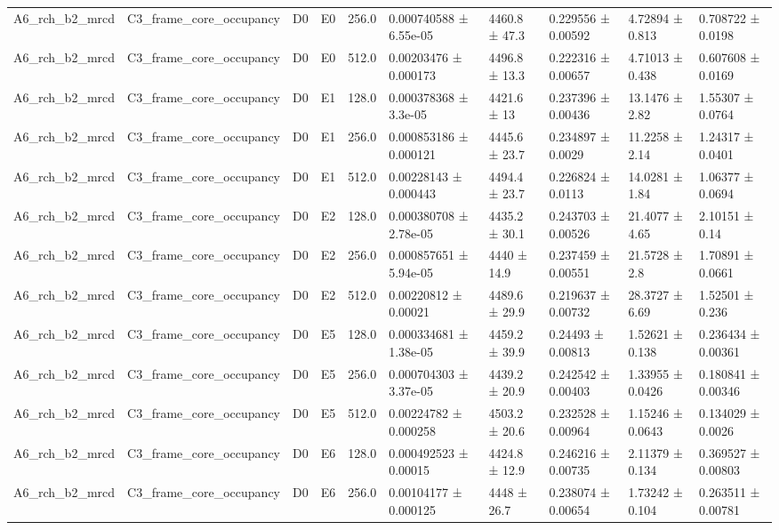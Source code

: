 \begin{table}
\begin{tabular}{llllllllll}
A6\_rch\_b2\_mrcd & C3\_frame\_core\_occupancy & D0 & E0 & 256.0 & 0.000740588 ± 6.55e-05 & 4460.8 ± 47.3 & 0.229556 ± 0.00592 & 4.72894 ± 0.813 & 0.708722 ± 0.0198 \\
A6\_rch\_b2\_mrcd & C3\_frame\_core\_occupancy & D0 & E0 & 512.0 & 0.00203476 ± 0.000173 & 4496.8 ± 13.3 & 0.222316 ± 0.00657 & 4.71013 ± 0.438 & 0.607608 ± 0.0169 \\
A6\_rch\_b2\_mrcd & C3\_frame\_core\_occupancy & D0 & E1 & 128.0 & 0.000378368 ± 3.3e-05 & 4421.6 ± 13 & 0.237396 ± 0.00436 & 13.1476 ± 2.82 & 1.55307 ± 0.0764 \\
A6\_rch\_b2\_mrcd & C3\_frame\_core\_occupancy & D0 & E1 & 256.0 & 0.000853186 ± 0.000121 & 4445.6 ± 23.7 & 0.234897 ± 0.0029 & 11.2258 ± 2.14 & 1.24317 ± 0.0401 \\
A6\_rch\_b2\_mrcd & C3\_frame\_core\_occupancy & D0 & E1 & 512.0 & 0.00228143 ± 0.000443 & 4494.4 ± 23.7 & 0.226824 ± 0.0113 & 14.0281 ± 1.84 & 1.06377 ± 0.0694 \\
A6\_rch\_b2\_mrcd & C3\_frame\_core\_occupancy & D0 & E2 & 128.0 & 0.000380708 ± 2.78e-05 & 4435.2 ± 30.1 & 0.243703 ± 0.00526 & 21.4077 ± 4.65 & 2.10151 ± 0.14 \\
A6\_rch\_b2\_mrcd & C3\_frame\_core\_occupancy & D0 & E2 & 256.0 & 0.000857651 ± 5.94e-05 & 4440 ± 14.9 & 0.237459 ± 0.00551 & 21.5728 ± 2.8 & 1.70891 ± 0.0661 \\
A6\_rch\_b2\_mrcd & C3\_frame\_core\_occupancy & D0 & E2 & 512.0 & 0.00220812 ± 0.00021 & 4489.6 ± 29.9 & 0.219637 ± 0.00732 & 28.3727 ± 6.69 & 1.52501 ± 0.236 \\
A6\_rch\_b2\_mrcd & C3\_frame\_core\_occupancy & D0 & E5 & 128.0 & 0.000334681 ± 1.38e-05 & 4459.2 ± 39.9 & 0.24493 ± 0.00813 & 1.52621 ± 0.138 & 0.236434 ± 0.00361 \\
A6\_rch\_b2\_mrcd & C3\_frame\_core\_occupancy & D0 & E5 & 256.0 & 0.000704303 ± 3.37e-05 & 4439.2 ± 20.9 & 0.242542 ± 0.00403 & 1.33955 ± 0.0426 & 0.180841 ± 0.00346 \\
A6\_rch\_b2\_mrcd & C3\_frame\_core\_occupancy & D0 & E5 & 512.0 & 0.00224782 ± 0.000258 & 4503.2 ± 20.6 & 0.232528 ± 0.00964 & 1.15246 ± 0.0643 & 0.134029 ± 0.0026 \\
A6\_rch\_b2\_mrcd & C3\_frame\_core\_occupancy & D0 & E6 & 128.0 & 0.000492523 ± 0.00015 & 4424.8 ± 12.9 & 0.246216 ± 0.00735 & 2.11379 ± 0.134 & 0.369527 ± 0.00803 \\
A6\_rch\_b2\_mrcd & C3\_frame\_core\_occupancy & D0 & E6 & 256.0 & 0.00104177 ± 0.000125 & 4448 ± 26.7 & 0.238074 ± 0.00654 & 1.73242 ± 0.104 & 0.263511 ± 0.00781 \\

\end{tabular}
\end{table}
